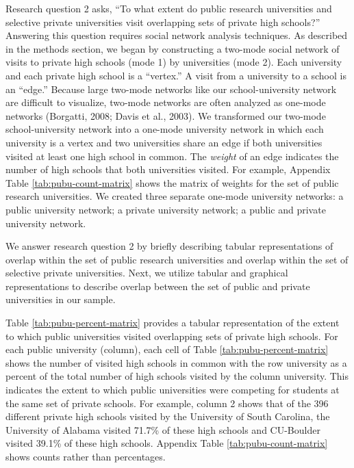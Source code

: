 \documentclass[
  12pt,
]{article}
\begin{document}
Research question 2 asks, ``To what extent do public research universities and selective private universities visit overlapping sets of private high schools?'' Answering this question requires social network analysis techniques. As described in the methods section, we began by constructing a two-mode social network of visits to private high schools (mode 1) by universities (mode 2). Each university and each private high school is a ``vertex.'' A visit from a university to a school is an ``edge.'' Because large two-mode networks like our school-university network are difficult to visualize, two-mode networks are often analyzed as one-mode networks (Borgatti, 2008; Davis et al., 2003). We transformed our two-mode school-university network into a one-mode university network in which each university is a vertex and two universities share an edge if both universities visited at least one high school in common. The \emph{weight} of an edge indicates the number of high schools that both universities visited. For example, Appendix Table \ref{tab:pubu-count-matrix} shows the matrix of weights for the set of public research universities. We created three separate one-mode university networks: a public university network; a private university network; a public and private university network.

We answer research question 2 by briefly describing tabular representations of overlap within the set of public research universities and overlap within the set of selective private universities. Next, we utilize tabular and graphical representations to describe overlap between the set of public and private universities in our sample.

Table \ref{tab:pubu-percent-matrix} provides a tabular representation of the extent to which public universities visited overlapping sets of private high schools. For each public university (column), each cell of Table \ref{tab:pubu-percent-matrix} shows the number of visited high schools in common with the row university as a percent of the total number of high schools visited by the column university. This indicates the extent to which public universities were competing for students at the same set of private schools. For example, column 2 shows that of the 396 different private high schools visited by the University of South Carolina, the University of Alabama visited 71.7\% of these high schools and CU-Boulder visited 39.1\% of these high schools. Appendix Table \ref{tab:pubu-count-matrix} shows counts rather than percentages.
\end{document}
